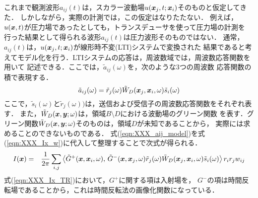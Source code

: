 これまで観測波形$a_{ij}(t)$は，スカラー波動場$u(\mbox{\boldmath $x$}_j,t;\mbox{\boldmath $x$}_i)$そのものと仮定してきた．
しかしながら，実際の計測では，この仮定はなりたたない．
例えば，$u(\mbox{\boldmath $x$},t)$が圧力場であったとしても，トランスデューサを使って圧力場の計測を
行った結果として得られる波形$a_{ij}(t)$は圧力波形そのものではない．
通常，$a_{ij}(t)$は，$u(\mbox{\boldmath $x$}_j,t;\mbox{\boldmath $x$}_i)$が線形時不変(LTI)システムで変換された
結果であると考えてモデル化を行う．LTIシステムの応答は，周波数域では，周波数応答関数を用いて
記述できる．ここでは，$\tilde a_{ij}(\omega)$を，次のような3つの周波数
応答関数の積で表現する．
\begin{equation}
	\tilde a_{ij}(\omega) = \tilde r_j(\omega) \tilde W_D(\mbox{\boldmath $x$}_j,\mbox{\boldmath $x$}_i,\omega) \tilde s_i(\omega)
	\label{eqn:XXX_aij_model}
\end{equation}
ここで，$\tilde s_i(\omega)$と$\tilde r_j(\omega))$は，送信および受信子の周波数応答関数をそれぞれ表す．
また，$\tilde W_D(\mbox{\boldmath $x$},\mbox{\boldmath $y$};\omega)$は，領域$B\setminus D$における波動場のグリーン関数
を表す．グリーン関数$\tilde W_D(\mbox{\boldmath $x$},\mbox{\boldmath $y$};\omega)$そのものは，領域$D$が未知であることから，
実際には求めることのできないものである．
式(\ref{eqn:XXX_aij_model})を式(\ref{eqn:XXX_Ix_w})に代入して整理することで次式が得られる．
\begin{eqnarray}
	I(\mbox{\boldmath $x$}) 
	&=&
	\frac{1}{2\pi} \sum_{i,j} 
	\left< 
	\tilde{G}^+(\mbox{\boldmath $x$},\mbox{\boldmath $x$}_i,\omega)
	,\, 
	\tilde{G}^-(\mbox{\boldmath $x$},\mbox{\boldmath $x$}_j,\omega)\tilde r_j(\omega) \tilde W_D(\mbox{\boldmath $x$}_j,\mbox{\boldmath $x$}_i,\omega) \tilde{s}_i(\omega)
	\right> r_ir_jw_{ij}
	\label{eqn:XXX_Ix_TR}
\end{eqnarray}
式(\ref{eqn:XXX_Ix_TR})において，$G^+$に関する項は入射場を，
$G^-$の項は時間反転場であることから，これは時間反転法の画像化関数になっている．




